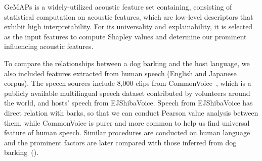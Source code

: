 
GeMAPs\cite{eyben2015geneva} is a widely-utilized acoustic feature set containing, consisting of statistical computation on acoustic features, which are low-level descriptors that exhibit high interpretability.
For its universality and explainability, it is selected as the input features to compute Shapley values and determine our prominent influencing acoustic features.

To compare the relationships between a dog barking and the host language, we also included features extracted from human speech (English and Japanese corpus). The speech sources include 8,000 clips from CommonVoice~\cite{ardila2019common}, which is a publicly available multilingual speech dataset contributed by volunteers around the world, and hosts' speech from EJShibaVoice. Speech from EJShibaVoice has direct relation with barks, so that we can conduct Pearson value analysis between them, while CommonVoice is purer and more common to help us find universal feature of human speech. Similar procedures are conducted on human language and the prominent factors are later compared with those inferred from dog barking~().  


